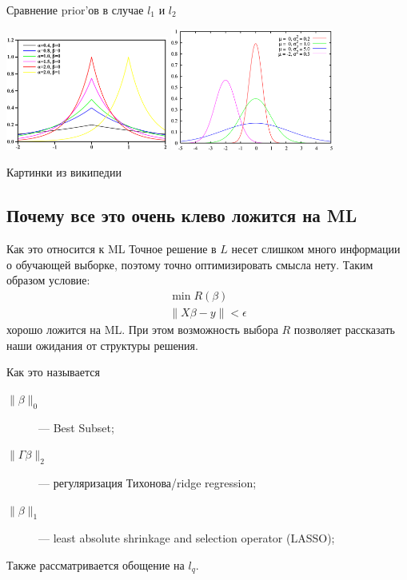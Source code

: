 \documentclass[14pt, fleqn, xcolor={dvipsnames, table}]{beamer}
\begin{document}
\begin{frame}{Сравнение prior'ов в случае $l_1$ и $l_2$}
\begin{center}
\includegraphics[width=0.4\textwidth,height=0.5\textheight]{800px-Laplace_distribution.png} 
\includegraphics[width=0.4\textwidth,height=0.5\textheight]{800px-Normal_distribution.png} 
\end{center}
Картинки из википедии
\end{frame}

\subsection{Почему все это очень клево ложится на ML}
\begin{frame}{Как это относится к ML}
Точное решение в $L$ несет слишком много информации о обучающей выборке, поэтому точно оптимизировать смысла нету. Таким образом условие:
$$\begin{array}{l}
\min R(\beta) \\
\|X\beta - y\| < \epsilon
\end{array}$$
хорошо ложится на ML. При этом возможность выбора $R$ позволяет рассказать наши ожидания от структуры решения.
\end{frame}

\begin{frame}{Как это называется}
\begin{description}
  \item[$\|\beta\|_0$] --- Best Subset;
  \item[$\|\Gamma\beta\|_2$] --- регуляризация Тихонова/ridge regression;
  \item[$\|\beta\|_1$] --- least absolute shrinkage and selection operator (LASSO);
\end{description}
Также рассматривается обощение на $l_q$.
\end{frame}
\end{document}
